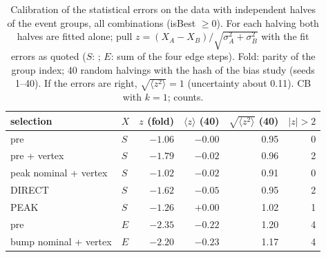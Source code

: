 \begin{table}[H]\centering\small
\caption{Calibration of the statistical errors on the data with independent halves of the event groups, all combinations (isBest $\geq0$). For each halving both halves are fitted alone; pull $z=(X_A-X_B)/\sqrt{\sigma_A^2+\sigma_B^2}$ with the fit errors as quoted ($S$: \Pmain; $E$: sum of the four edge steps). Fold: parity of the group index; 40 random halvings with the hash of the bias study (seeds 1--40). If the errors are right, $\sqrt{\langle z^2\rangle}=1$ (uncertainty about 0.11). CB with $k=1$; counts.}
\label{tab:fix_stat}
\begin{tabular}{@{}l l r r r r@{}}
\toprule
selection & $X$ & $z$ (fold) & $\langle z\rangle$ (40) & $\sqrt{\langle z^2\rangle}$ (40) & $|z|>2$ \\
\midrule
pre & $S$ & $-1.06$ & $-0.00$ & 0.95 & 0 \\
pre + vertex & $S$ & $-1.79$ & $-0.02$ & 0.96 & 2 \\
peak nominal + vertex & $S$ & $-1.02$ & $-0.02$ & 0.91 & 0 \\
DIRECT & $S$ & $-1.62$ & $-0.05$ & 0.95 & 2 \\
PEAK & $S$ & $-1.26$ & $+0.00$ & 1.02 & 1 \\
pre & $E$ & $-2.35$ & $-0.22$ & 1.20 & 4 \\
bump nominal + vertex & $E$ & $-2.20$ & $-0.23$ & 1.17 & 4 \\
\bottomrule
\end{tabular}
\end{table}
